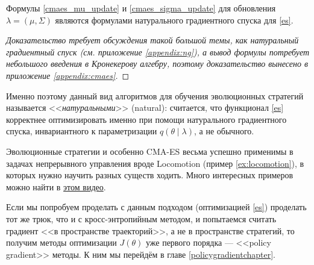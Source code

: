 \begin{theorem}
Формулы \eqref{cmaes_mu_update} и \eqref{cmaes_sigma_update} для обновления $\lambda = (\mu, \Sigma)$ являются формулами натурального градиентного спуска для \eqref{es}.
\begin{proof}[Доказательство требует обсуждения такой большой темы, как натуральный градиентный спуск (см. приложение \ref{appendix:ng}), а вывод формулы потребует небольшого введения в Кронекерову алгебру, поэтому доказательство вынесено в приложение \ref{appendix:cmaes}] 
\end{proof}
\end{theorem}

Именно поэтому данный вид алгоритмов для обучения эволюционных стратегий называется <<\emph{натуральными}>> (natural): считается, что функционал \eqref{es} корректнее оптимизировать именно при помощи натурального градиентного спуска, инвариантного к параметризации $q(\theta \mid \lambda)$, а не обычного.

\begin{example}
\begin{center}
\end{center}
\end{example}

\begin{example}
Эволюционные стратегии и особенно CMA-ES весьма успешно применимы в задачах непрерывного управления вроде Locomotion (пример \ref{ex:locomotion}), в которых нужно научить разных существ ходить. Много интересных примеров можно найти в \href{https://www.youtube.com/watch?v=pgaEE27nsQw}{этом видео}.
\end{example}

Если мы попробуем проделать с данным подходом (оптимизацией \eqref{es}) проделать тот же трюк, что и с кросс-энтропийным методом, и попытаемся считать градиент <<в пространстве траекторий>>, а не в пространстве стратегий, то получим методы оптимизации $J(\theta)$ уже первого порядка --- <<policy gradient>> методы. К ним мы перейдём в главе \ref{policygradientchapter}.